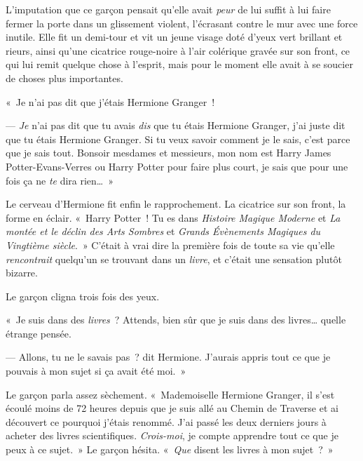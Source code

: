 L'imputation que ce garçon pensait qu'elle avait \emph{peur} de lui suffit à lui faire fermer la porte dans un glissement violent, l'écrasant contre le mur avec une force inutile. Elle fit un demi-tour et vit un jeune visage doté d'yeux vert brillant et rieurs, ainsi qu'une cicatrice rouge-noire à l'air colérique gravée sur son front, ce qui lui remit quelque chose à l'esprit, mais pour le moment elle avait à se soucier de choses plus importantes.

«~Je n'ai pas dit que j'étais Hermione Granger~!

--- \emph{Je} n'ai pas dit que tu avais \emph{dis} que tu étais Hermione Granger, j'ai juste dit que tu étais Hermione Granger. Si tu veux savoir comment je le sais, c'est parce que je sais tout. Bonsoir mesdames et messieurs, mon nom est Harry James Potter-Evans-Verres ou Harry Potter pour faire plus court, je sais que pour une fois ça ne \emph{te} dira rien…~»

Le cerveau d'Hermione fit enfin le rapprochement. La cicatrice sur son front, la forme en éclair. «~Harry Potter~! Tu es dans \emph{Histoire Magique Moderne} et \emph{La montée et le déclin des Arts Sombres} et \emph{Grands Évènements Magiques du Vingtième siècle}.~» C'était à vrai dire la première fois de toute sa vie qu'elle \emph{rencontrait} quelqu'un se trouvant dans un \emph{livre}, et c'était une sensation plutôt bizarre.

Le garçon cligna trois fois des yeux.

«~Je suis dans des \emph{livres}~? Attends, bien sûr que je suis dans des livres… quelle étrange pensée.

--- Allons, tu ne le savais pas~? dit Hermione. J'aurais appris tout ce que je pouvais à mon sujet si ça avait été moi.~»

Le garçon parla assez sèchement. «~Mademoiselle Hermione Granger, il s'est écoulé moins de 72 heures depuis que je suis allé au Chemin de Traverse et ai découvert ce pourquoi j'étais renommé. J'ai passé les deux derniers jours à acheter des livres scientifiques. \emph{Crois-moi}, je compte apprendre tout ce que je peux à ce sujet.~» Le garçon hésita. «~\emph{Que} disent les livres à mon sujet~?~»

